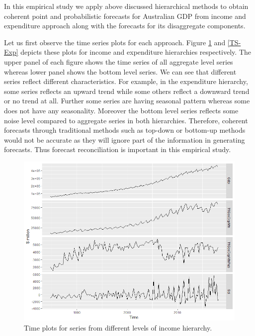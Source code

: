 \documentclass[graybox]{svmult}
\begin{document}
In this empirical study we apply above discussed hierarchical methods to obtain coherent point and probabilistic forecasts for Australian GDP from income and expenditure approach along with the forecasts for its disaggregate components. 

Let us first observe the time series plots for each approach. Figure \ref{TS-Inc} and \ref{TS-Exp} depicts these plots for income and expenditure hierarchies respectively. The upper panel of each figure shows the time series of all aggregate level series whereas lower panel shows the bottom level series. We can see that different series reflect different characteristics. For example, in the expenditure hierarchy, some series reflects an upward trend while some others reflect a downward trend or no trend at all. Further some series are having seasonal pattern whereas some does not have any seasonality. Moreover the bottom level series reflects some noise level compared to aggregate series in both hierarchies. Therefore, coherent forecasts through traditional methods such as top-down or bottom-up methods would not be accurate as they will ignore part of the information in generating forecasts. Thus forecast reconciliation is important in this empirical study. 

\begin{figure}[H]
	\centering
	\small
	\includegraphics[scale=0.50]{Figs/TS-plots/INC-char-of-levels-TSplots.PNG}
	\caption{Time plots for series from different levels of income hierarchy.}\label{TS-Inc}
\end{figure}
\end{document}
